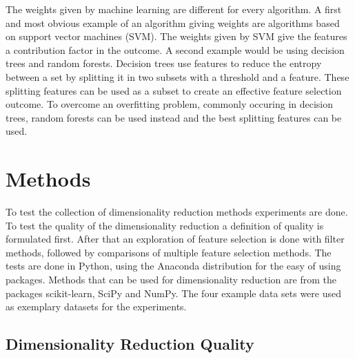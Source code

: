 \documentclass[10pt,a4paper]{article}
\begin{document}
	The weights given by machine learning are different for every algorithm. A first and most obvious example of an algorithm giving weights are algorithms based on support vector machines (SVM). The weights given by SVM give the features a contribution factor in the outcome\cite{jong2004feature, prados2004mining, zhang2006recursive, guyon2002gene}. A second example would be using decision trees and random forests. Decision trees use features to reduce the entropy between a set by splitting it in two subsets with a threshold and a feature. These splitting features can be used as a subset to create an effective feature selection outcome\cite{geurts2005proteomic, wu2003comparison, Duch2006}. To overcome an overfitting problem, commonly occuring in decision trees, random forests can be used instead and the best splitting features can be used\cite{liaw2002classification}.

	
	
	
	\section{Methods}
	\label{sec:Methods}

	To test the collection of dimensionality reduction methods experiments are done. To test the quality of the dimensionality reduction a definition of quality is formulated first. After that an exploration of feature selection is done with filter methods, followed by comparisons of multiple feature selection methods. The tests are done in Python, using the Anaconda distribution for the easy of using packages. Methods that can be used for dimensionality reduction are from the packages scikit-learn\cite{pedregosa2011scikit}, SciPy\cite{jones2014scipy} and NumPy\cite{walt2011numpy}. The four example data sets were used as exemplary datasets for the experiments.
	
	\subsection{Dimensionality Reduction Quality}
	\label{subsec:DimensionalityReductionQuality}
	
\end{document}
